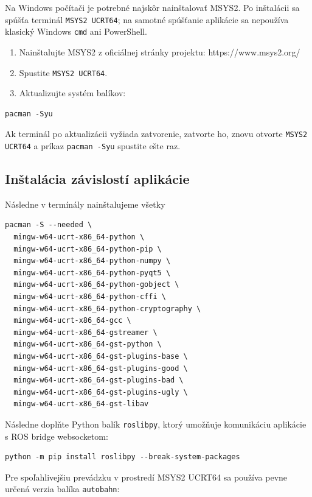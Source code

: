 \documentclass[a4paper,12pt]{article}
\begin{document}
Na Windows počítači je potrebné najskôr nainštalovať MSYS2. Po inštalácii sa spúšťa terminál \texttt{MSYS2 UCRT64}; na samotné spúšťanie aplikácie sa nepoužíva klasický Windows \texttt{cmd} ani PowerShell.

\begin{enumerate}
    \item Nainštalujte MSYS2 z oficiálnej stránky projektu: https://www.msys2.org/
    \item Spustite \texttt{MSYS2 UCRT64}.
    \item Aktualizujte systém balíkov:
\end{enumerate}

\begin{lstlisting}[style=terminal]
pacman -Syu
\end{lstlisting}

Ak terminál po aktualizácii vyžiada zatvorenie, zatvorte ho, znovu otvorte \texttt{MSYS2 UCRT64} a príkaz \texttt{pacman -Syu} spustite ešte raz.

\subsection{Inštalácia závislostí aplikácie}

Následne v termínály nainštalujeme všetky
\begin{lstlisting}[style=terminal]
pacman -S --needed \
  mingw-w64-ucrt-x86_64-python \
  mingw-w64-ucrt-x86_64-python-pip \
  mingw-w64-ucrt-x86_64-python-numpy \
  mingw-w64-ucrt-x86_64-python-pyqt5 \
  mingw-w64-ucrt-x86_64-python-gobject \
  mingw-w64-ucrt-x86_64-python-cffi \
  mingw-w64-ucrt-x86_64-python-cryptography \
  mingw-w64-ucrt-x86_64-gcc \
  mingw-w64-ucrt-x86_64-gstreamer \
  mingw-w64-ucrt-x86_64-gst-python \
  mingw-w64-ucrt-x86_64-gst-plugins-base \
  mingw-w64-ucrt-x86_64-gst-plugins-good \
  mingw-w64-ucrt-x86_64-gst-plugins-bad \
  mingw-w64-ucrt-x86_64-gst-plugins-ugly \
  mingw-w64-ucrt-x86_64-gst-libav
\end{lstlisting}

Následne doplňte Python balík \texttt{roslibpy}, ktorý umožňuje komunikáciu aplikácie s ROS bridge websocketom:

\begin{lstlisting}[style=terminal]
python -m pip install roslibpy --break-system-packages
\end{lstlisting}

Pre spoľahlivejšiu prevádzku v prostredí MSYS2 UCRT64 sa používa pevne určená verzia balíka \texttt{autobahn}:
\end{document}
